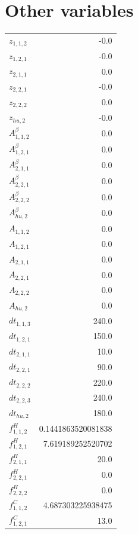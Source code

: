 \documentclass{article}%
\makeatletter
\let\mcnewpage=\newpage%
\newcommand{\TrickSupertabularIntoMulticols}{%
\renewcommand\newpage{%
\if@firstcolumn%
\hrule width\linewidth height0pt%
\columnbreak%
\else%
\mcnewpage%
\fi%
}%
}%
\makeatother
\begin{document}
\section{Other variables}%
\thispagestyle{plain}%
\begin{multicols*}{3}%
\TrickSupertabularIntoMulticols%
%
\begin{supertabular}{lr}%
	$z_{1,1,2}$ & -0.0 \\%
	$z_{1,2,1}$ & -0.0 \\%
	$z_{2,1,1}$ & 0.0 \\%
	$z_{2,2,1}$ & -0.0 \\%
	$z_{2,2,2}$ & 0.0 \\%
	$z_{hu,2}$ & -0.0 \\%
	$A_{1,1,2}^{\beta}$ & 0.0 \\%
	$A_{1,2,1}^{\beta}$ & 0.0 \\%
	$A_{2,1,1}^{\beta}$ & 0.0 \\%
	$A_{2,2,1}^{\beta}$ & 0.0 \\%
	$A_{2,2,2}^{\beta}$ & 0.0 \\%
	$A_{hu,2}^{\beta}$ & 0.0 \\%
	$A_{1,1,2}$ & 0.0 \\%
	$A_{1,2,1}$ & 0.0 \\%
	$A_{2,1,1}$ & 0.0 \\%
	$A_{2,2,1}$ & 0.0 \\%
	$A_{2,2,2}$ & 0.0 \\%
	$A_{hu,2}$ & 0.0 \\%
	$dt_{1,1,3}$ & 240.0 \\%
	$dt_{1,2,1}$ & 150.0 \\%
	$dt_{2,1,1}$ & 10.0 \\%
	$dt_{2,2,1}$ & 90.0 \\%
	$dt_{2,2,2}$ & 220.0 \\%
	$dt_{2,2,3}$ & 240.0 \\%
	$dt_{hu,2}$ & 180.0 \\%
	$f_{1,1,2}^{H}$ & 0.1441863520081838 \\%
	$f_{1,2,1}^{H}$ & 7.619189252520702 \\%
	$f_{2,1,1}^{H}$ & 20.0 \\%
	$f_{2,2,1}^{H}$ & 0.0 \\%
	$f_{2,2,2}^{H}$ & 0.0 \\%
	$f_{1,1,2}^{C}$ & 4.687303225938475 \\%
	$f_{1,2,1}^{C}$ & 13.0 \\%

\end{supertabular}
\end{multicols*}
\end{document}
